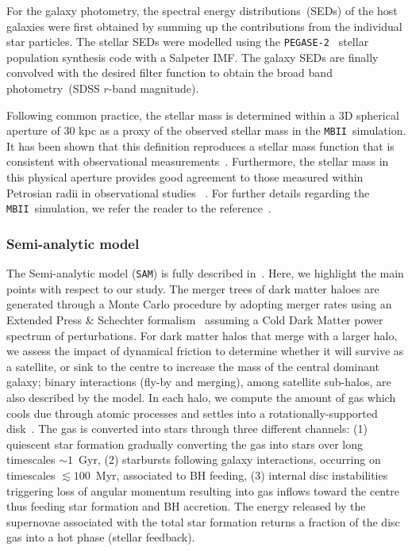 \documentclass[twocolumn,trackchanges]{aastex63}
\newcommand{\sam}{\texttt{SAM}}
\newcommand{\mbii}{\texttt{MBII}}
\begin{document}
For the galaxy photometry, the spectral energy distributions~(SEDs) of the host galaxies were first obtained by summing up the contributions from the individual star particles. The stellar SEDs were modelled using the \texttt{PEGASE-2}~\citep{1999astro.ph.12179F} stellar population synthesis code with a Salpeter IMF. The galaxy SEDs are finally convolved with the desired filter function to obtain the broad band photometry~(SDSS $r$-band magnitude). 

Following common practice, the stellar mass is determined within a 3D spherical aperture of 30 kpc as a proxy of the observed stellar mass in the \mbii\ simulation. It has been shown that this definition reproduces a stellar mass function that is consistent with observational measurements~\citep{Pillepich2018}. Furthermore, the stellar mass in this physical aperture provides good agreement to those measured within Petrosian radii in observational studies ~\citep{Schaye2015}. For further details regarding the \mbii\ simulation, we refer the reader to the reference~\citep{2015MNRAS.450.1349K}.

\subsubsection{Semi-analytic model}
\label{sec_intro_SAM}
The Semi-analytic model (\sam) is fully described in~\citet{Menci2016}. Here, we highlight the main points with respect to our study. The merger trees of dark matter haloes are generated through a Monte Carlo procedure by adopting merger rates using an Extended Press \& Schechter formalism~\citep{Lacey1993} assuming a Cold Dark Matter power spectrum of perturbations. For dark matter halos  that merge with a larger halo, we assess the impact of dynamical friction to determine whether it will survive as a satellite, or sink to the centre to increase the mass of the central dominant galaxy; binary interactions (fly-by and merging), among satellite sub-halos, are also described by the model. In each halo, we compute the amount of gas which cools due through atomic processes and settles into a rotationally-supported disk~\citep{Mo1998}. The gas is converted into stars through three different channels: (1) quiescent star formation gradually converting the gas into stars over long timescales $\sim 1$~Gyr, (2) starbursts following galaxy interactions, occurring on timescales $\lesssim 100$~Myr, associated to BH feeding, (3) internal disc instabilities triggering loss of angular momentum resulting into gas inflows toward the centre thus feeding star formation and BH accretion. The energy released by the supernovae associated with the total star formation returns a fraction of the disc gas into a hot phase (stellar feedback). 
\end{document}
